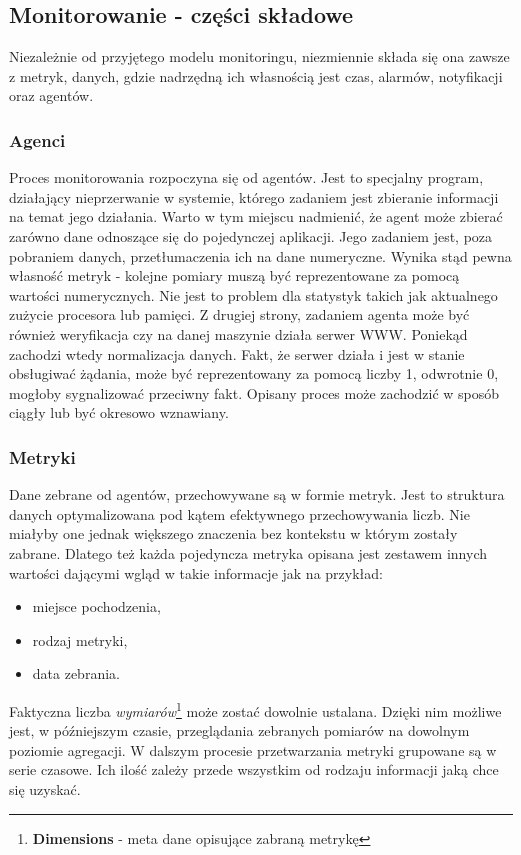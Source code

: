     \subsection{Monitorowanie - części składowe}
    Niezależnie od przyjętego modelu monitoringu, niezmiennie składa się ona zawsze z metryk, danych, gdzie nadrzędną 
    ich własnością jest czas, alarmów, notyfikacji oraz agentów.
    
        \subsubsection{Agenci}
        Proces monitorowania rozpoczyna się od agentów. Jest to specjalny program, działający nieprzerwanie w systemie, którego
        zadaniem jest zbieranie informacji na temat jego działania. Warto w tym miejscu nadmienić, że agent może zbierać zarówno
        dane odnoszące się do pojedynczej aplikacji. Jego zadaniem jest, poza pobraniem danych, przetłumaczenia ich na dane 
        numeryczne. Wynika stąd pewna własność metryk - kolejne pomiary muszą być reprezentowane za pomocą wartości numerycznych.
        Nie jest to problem dla statystyk takich jak aktualnego zużycie procesora lub pamięci. Z drugiej strony, zadaniem agenta
        może być również weryfikacja czy na danej maszynie działa serwer WWW. Poniekąd zachodzi wtedy normalizacja danych. Fakt, że
        serwer działa i jest w stanie obsługiwać żądania, może być reprezentowany za pomocą liczby 1, odwrotnie 0, mogłoby sygnalizować
        przeciwny fakt. Opisany proces może zachodzić w sposób ciągły lub być okresowo wznawiany. 
        
        \subsubsection{Metryki}
        Dane zebrane od agentów, przechowywane są w formie metryk. Jest to struktura danych optymalizowana pod kątem
        efektywnego przechowywania liczb. Nie miałyby one jednak większego znaczenia bez kontekstu w którym zostały
        zabrane. Dlatego też każda pojedyncza metryka opisana jest zestawem innych wartości dającymi wgląd w takie
        informacje jak na przykład:
        \begin{itemize}
            \item miejsce pochodzenia,
            \item rodzaj metryki,
            \item data zebrania.
        \end{itemize}
        Faktyczna liczba \textit{wymiarów}\footnote{\textbf{Dimensions} - meta dane opisujące zabraną metrykę} może
        zostać dowolnie ustalana. Dzięki nim możliwe jest, w późniejszym czasie, przeglądania zebranych pomiarów
        na dowolnym poziomie agregacji. W dalszym procesie przetwarzania metryki grupowane są w serie czasowe. Ich ilość
        zależy przede wszystkim od rodzaju informacji jaką chce się uzyskać.
        
